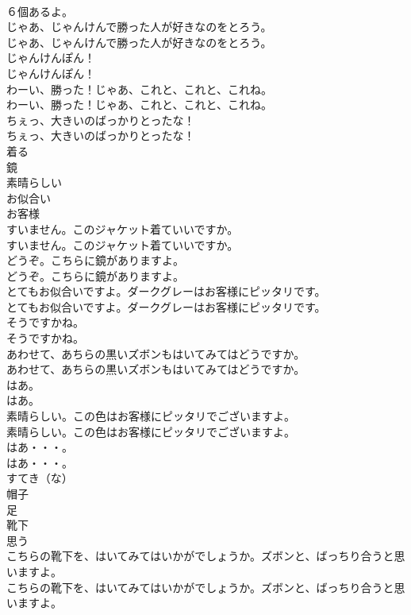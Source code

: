 \documentclass[8pt]{extreport}
\begin{document}
\begin{CJK}{UTF8}{min}
\\	６個あるよ。 
\\	じゃあ、じゃんけんで勝った人が好きなのをとろう。	
\\	じゃあ、じゃんけんで勝った人が好きなのをとろう。 
\\	じゃんけんぽん！	
\\	じゃんけんぽん！ 
\\	わーい、勝った！じゃあ、これと、これと、これね。	
\\	わーい、勝った！じゃあ、これと、これと、これね。 
\\	ちぇっ、大きいのばっかりとったな！	
\\	ちぇっ、大きいのばっかりとったな！ 
\\	着る
\\	鏡
\\	素晴らしい
\\	お似合い
\\	お客様
\\	すいません。このジャケット着ていいですか。	
\\	すいません。このジャケット着ていいですか。 
\\	どうぞ。こちらに鏡がありますよ。	
\\	どうぞ。こちらに鏡がありますよ。 
\\	とてもお似合いですよ。ダークグレーはお客様にピッタリです。	
\\	とてもお似合いですよ。ダークグレーはお客様にピッタリです。 
\\	そうですかね。	
\\	そうですかね。 
\\	あわせて、あちらの黒いズボンもはいてみてはどうですか。	
\\	あわせて、あちらの黒いズボンもはいてみてはどうですか。 
\\	はあ。	
\\	はあ。 
\\	素晴らしい。この色はお客様にピッタリでございますよ。	
\\	素晴らしい。この色はお客様にピッタリでございますよ。 
\\	はあ・・・。	
\\	はあ・・・。 
\\	すてき（な）
\\	帽子
\\	足
\\	靴下
\\	思う
\\	こちらの靴下を、はいてみてはいかがでしょうか。ズボンと、ばっちり合うと思いますよ。	
\\	こちらの靴下を、はいてみてはいかがでしょうか。ズボンと、ばっちり合うと思いますよ。 

\end{CJK}
\end{document}
